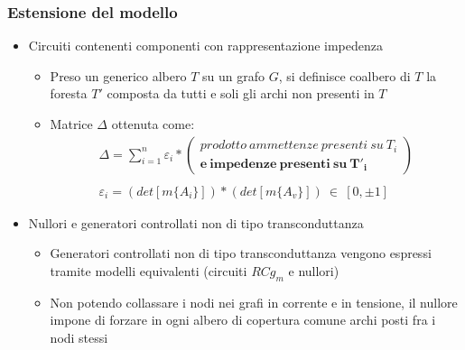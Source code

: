\begin{frame}
 \frametitle{Estensione del modello}

 \begin{itemize}
  \item Circuiti contenenti componenti con rappresentazione impedenza
    \begin{itemize}
     \item Preso un generico albero $T$ su un grafo $G$, si definisce coalbero di $T$ la foresta $T'$ composta da tutti e soli gli archi non presenti in $T$
     \item Matrice $\Delta$ ottenuta come:
      $$
      \begin{array}{c}
      \Delta =
	\sum_{i=1}^n{
	  \varepsilon_i\ast\left(\begin{array}{c}
	    prodotto~ammettenze~presenti~su~T_i\\ \boldsymbol{e~impedenze~presenti~su~T'_i}
	  \end{array}\right)
	}\\ \\
      \varepsilon_i = \left( det\left[ m\{ A_i \}\right]\right)\ast\left( det\left[ m\{ A_v\}\right]\right)~\in~\left[ 0,\pm 1\right]
      \end{array}
      $$
    \end{itemize}
  \item Nullori e generatori controllati non di tipo transconduttanza
    \begin{itemize}
     \item Generatori controllati non di tipo transconduttanza vengono espressi tramite modelli equivalenti (circuiti $RCg_m$ e nullori)
     \item Non potendo collassare i nodi nei grafi in corrente e in tensione, il nullore impone di forzare in ogni albero di copertura comune archi posti fra i nodi stessi
    \end{itemize}
 \end{itemize}

\end{frame}


